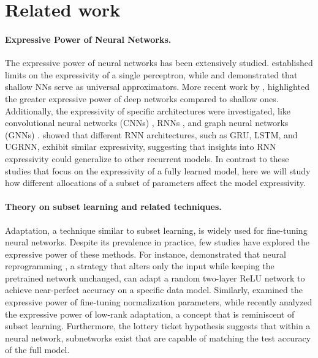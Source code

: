 \section{Related work}
\paragraph{Expressive Power of Neural Networks.} 

The expressive power of neural networks has been extensively studied. \citet{cover1965geometrical} established limits on the expressivity of a single perceptron, while \citet{Cybenko1989ApproximationBS} and \citet{HORNIK1989359} demonstrated that shallow NNs serve as universal approximators. More recent work by \citet{raghu2017expressivepowerdeepneural,cohen2016expressivepowerdeeplearning,montúfar2014numberlinearregionsdeep}, highlighted the greater expressive power of deep networks compared to shallow ones. Additionally, the expressivity of specific architectures were investigated, like convolutional neural networks (CNNs) \citep{cohen2016expressivepowerdeeplearning}, RNNs \citep{SIEGELMANN1995132,khrulkov2018expressivepowerrecurrentneural}, and graph neural networks (GNNs) \citep{joshi2024expressivepowergeometricgraph}. \citet{collins2017capacitytrainabilityrecurrentneural} showed that different RNN architectures, such as GRU, LSTM, and UGRNN, exhibit similar expressivity, suggesting that insights into RNN expressivity could generalize to other recurrent models. In contrast to these studies that focus on the expressivity of a fully learned model, here we will study how different allocations of a subset of parameters affect the model expressivity.

\paragraph{Theory on subset learning and related techniques.}

Adaptation, a technique similar to subset learning, is widely used for fine-tuning neural networks. Despite its prevalence in practice, few studies have explored the expressive power of these methods. For instance, \citet{englert2022adversarialreprogrammingrevisited} demonstrated that neural reprogramming \citep{elsayed2018adversarialreprogrammingneuralnetworks}, a strategy that alters only the input while keeping the pretrained network unchanged, can adapt a random two-layer ReLU network to achieve near-perfect accuracy on a specific data model. Similarly, \citet{giannou2023expressivepowertuningnormalization} examined the expressive power of fine-tuning normalization parameters, while \citet{zeng2024expressivepowerlowrankadaptation} recently analyzed the expressive power of low-rank adaptation, a concept that is reminiscent of subset learning. Furthermore, the lottery ticket hypothesis \citep{frankle2019lotterytickethypothesisfinding, malach2020provinglotterytickethypothesis} suggests that within a neural network, subnetworks exist that are capable of matching the test accuracy of the full model.